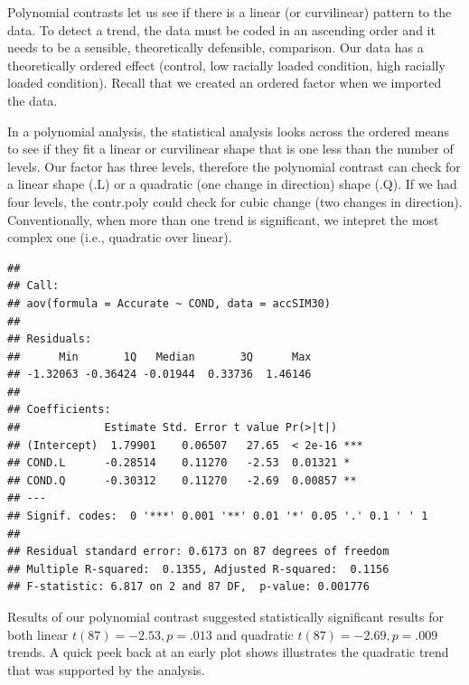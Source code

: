\documentclass[
  english,
]{book}
\newenvironment{Shaded}{\begin{snugshade}}{\end{snugshade}}
\newcommand{\DataTypeTok}[1]{\textcolor[rgb]{0.13,0.29,0.53}{#1}}
\newcommand{\DecValTok}[1]{\textcolor[rgb]{0.00,0.00,0.81}{#1}}
\newcommand{\KeywordTok}[1]{\textcolor[rgb]{0.13,0.29,0.53}{\textbf{#1}}}
\newcommand{\NormalTok}[1]{#1}
\newcommand{\OperatorTok}[1]{\textcolor[rgb]{0.81,0.36,0.00}{\textbf{#1}}}
\newcommand{\StringTok}[1]{\textcolor[rgb]{0.31,0.60,0.02}{#1}}
\begin{document}
Polynomial contrasts let us see if there is a linear (or curvilinear) pattern to the data. To detect a trend, the data must be coded in an ascending order and it needs to be a sensible, theoretically defensible, comparison. Our data has a theoretically ordered effect (control, low racially loaded condition, high racially loaded condition). Recall that we created an ordered factor when we imported the data.

In a polynomial analysis, the statistical analysis looks across the ordered means to see if they fit a linear or curvilinear shape that is one less than the number of levels. Our factor has three levels, therefore the polynomial contrast can check for a linear shape (.L) or a quadratic (one change in direction) shape (.Q). If we had four levels, the contr.poly could check for cubic change (two changes in direction). Conventionally, when more than one trend is significant, we intepret the most complex one (i.e., quadratic over linear).

\begin{Shaded}
\end{Shaded}

\begin{verbatim}
## 
## Call:
## aov(formula = Accurate ~ COND, data = accSIM30)
## 
## Residuals:
##      Min       1Q   Median       3Q      Max 
## -1.32063 -0.36424 -0.01944  0.33736  1.46146 
## 
## Coefficients:
##             Estimate Std. Error t value Pr(>|t|)    
## (Intercept)  1.79901    0.06507   27.65  < 2e-16 ***
## COND.L      -0.28514    0.11270   -2.53  0.01321 *  
## COND.Q      -0.30312    0.11270   -2.69  0.00857 ** 
## ---
## Signif. codes:  0 '***' 0.001 '**' 0.01 '*' 0.05 '.' 0.1 ' ' 1
## 
## Residual standard error: 0.6173 on 87 degrees of freedom
## Multiple R-squared:  0.1355, Adjusted R-squared:  0.1156 
## F-statistic: 6.817 on 2 and 87 DF,  p-value: 0.001776
\end{verbatim}

Results of our polynomial contrast suggested statistically significant results for both linear \(t(87) = -2.53, p = .013\) and quadratic \(t(87) = -2.69, p = .009\) trends. A quick peek back at an early plot shows illustrates the quadratic trend that was supported by the analysis.
\end{document}
